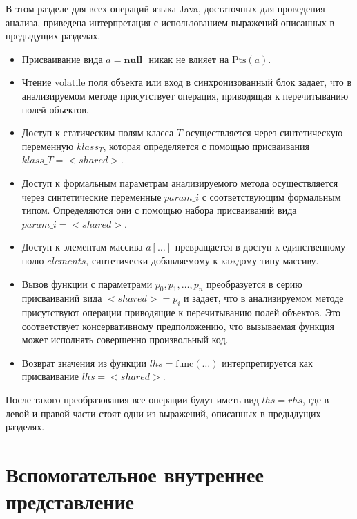 \documentclass[14pt,titlepage]{extarticle}
\newcommand{\NULL}{\textbf{null }}
\newcommand{\Pts}[1]{\textrm{Pts}(#1)}
\newcommand{\eng}[1]{{\English#1}}
\let\oldsection\section
\renewcommand{\section}{\newpage\oldsection}
\begin{document}
        В этом разделе для всех операций языка Java, достаточных для
        проведения анализа, приведена интерпретация с использованием выражений
        описанных в предыдущих разделах.
        \begin{itemize}
          \item Присваивание вида $a = \NULL$ никак не влияет на $\Pts{a}$.
          \item Чтение \eng{volatile} поля объекта или вход в синхронизованный
                блок задает, что в анализируемом методе присутствует операция,
                приводящая к перечитыванию полей объектов.
          \item Доступ к статическим полям класса $T$ осуществляется через
                синтетическую переменную $klass_T$, которая определяется с
                помощью присваивания $klass\_T = {<}shared{>}$.
          \item Доступ к формальным параметрам анализируемого метода
                осуществляется через синтетические переменные $param\_i$ с
                соответствующим формальным типом.
                Определяются они с помощью набора присваиваний вида
                $param\_i = {<}shared{>}$.
          \item Доступ к элементам массива $a[\ldots]$ превращается в доступ к
                единственному полю $elements$, синтетически добавляемому к
                каждому типу-массиву.
          \item Вызов функции с параметрами $p_0, p_1, \ldots, p_n$
                преобразуется в серию присваиваний вида ${<}shared{>} = p_i$ и
                задает, что в анализируемом методе присутствуют операции
                приводящие к перечитыванию полей объектов. Это соответствует
                консервативному предположению, что вызываемая функция может
                исполнять совершенно произвольный код.
          \item Возврат значения из функции $lhs = \textrm{func}(\ldots)$
                интерпретируется как присваивание $lhs = {<}shared{>}$.
        \end{itemize}
        После такого преобразования все операции будут иметь вид $lhs = rhs$,
        где в левой и правой части стоят одни из выражений, описанных в
        предыдущих разделях.

  \section{Вспомогательное внутреннее представление}
    \label{section:analysis_aux_ir}
\end{document}
